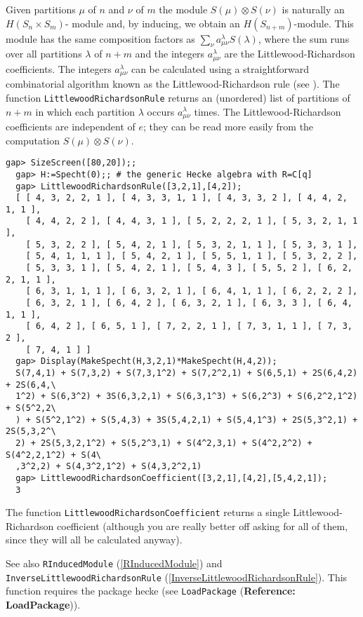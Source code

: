 \documentclass[a4paper,11pt]{report}
\begin{document}
{{{ Given partitions $\mu$ of $n$ and $\nu$ of $m$ the module $S(\mu)\otimes S(\nu)$ is naturally an $H(S_n\times S_m)$- module and, by inducing, we obtain an $H(S_{n+m})$-module. This module has the same composition factors as $\sum_{\nu} a_{\mu\nu}^\lambda S(\lambda)$, where the sum runs over all partitions $\lambda$ of $n+m$ and the integers $a_{\mu\nu}^\lambda$ are the Littlewood-Richardson coefficients. The integers $a_{\mu\nu}^\lambda$ can be calculated using a straightforward combinatorial algorithm known as the
Littlewood-Richardson rule (see \cite{JK}). The function \texttt{LittlewoodRichardsonRule} returns an (unordered) list of partitions of $n+m$ in which each partition $\lambda$ occurs $a_{\mu\nu}^\lambda$ times. The Littlewood-Richardson coefficients are independent of $e$; they can be read more easily from the computation $S(\mu)\otimes S(\nu)$. 
\begin{Verbatim}[fontsize=\small,frame=single,label=Example]
  gap> SizeScreen([80,20]);;
  gap> H:=Specht(0);; # the generic Hecke algebra with R=C[q]
  gap> LittlewoodRichardsonRule([3,2,1],[4,2]);
  [ [ 4, 3, 2, 2, 1 ], [ 4, 3, 3, 1, 1 ], [ 4, 3, 3, 2 ], [ 4, 4, 2, 1, 1 ],
    [ 4, 4, 2, 2 ], [ 4, 4, 3, 1 ], [ 5, 2, 2, 2, 1 ], [ 5, 3, 2, 1, 1 ],
    [ 5, 3, 2, 2 ], [ 5, 4, 2, 1 ], [ 5, 3, 2, 1, 1 ], [ 5, 3, 3, 1 ],
    [ 5, 4, 1, 1, 1 ], [ 5, 4, 2, 1 ], [ 5, 5, 1, 1 ], [ 5, 3, 2, 2 ],
    [ 5, 3, 3, 1 ], [ 5, 4, 2, 1 ], [ 5, 4, 3 ], [ 5, 5, 2 ], [ 6, 2, 2, 1, 1 ],
    [ 6, 3, 1, 1, 1 ], [ 6, 3, 2, 1 ], [ 6, 4, 1, 1 ], [ 6, 2, 2, 2 ],
    [ 6, 3, 2, 1 ], [ 6, 4, 2 ], [ 6, 3, 2, 1 ], [ 6, 3, 3 ], [ 6, 4, 1, 1 ],
    [ 6, 4, 2 ], [ 6, 5, 1 ], [ 7, 2, 2, 1 ], [ 7, 3, 1, 1 ], [ 7, 3, 2 ],
    [ 7, 4, 1 ] ]
  gap> Display(MakeSpecht(H,3,2,1)*MakeSpecht(H,4,2));
  S(7,4,1) + S(7,3,2) + S(7,3,1^2) + S(7,2^2,1) + S(6,5,1) + 2S(6,4,2) + 2S(6,4,\
  1^2) + S(6,3^2) + 3S(6,3,2,1) + S(6,3,1^3) + S(6,2^3) + S(6,2^2,1^2) + S(5^2,2\
  ) + S(5^2,1^2) + S(5,4,3) + 3S(5,4,2,1) + S(5,4,1^3) + 2S(5,3^2,1) + 2S(5,3,2^\
  2) + 2S(5,3,2,1^2) + S(5,2^3,1) + S(4^2,3,1) + S(4^2,2^2) + S(4^2,2,1^2) + S(4\
  ,3^2,2) + S(4,3^2,1^2) + S(4,3,2^2,1)
  gap> LittlewoodRichardsonCoefficient([3,2,1],[4,2],[5,4,2,1]);
  3
\end{Verbatim}
 The function \texttt{LittlewoodRichardsonCoefficient} returns a single Littlewood-Richardson coefficient (although you are really
better off asking for all of them, since they will all be calculated anyway).

 See also \texttt{RInducedModule} (\ref{RInducedModule}) and \texttt{InverseLittlewoodRichardsonRule} (\ref{InverseLittlewoodRichardsonRule}). This function requires the package \textsf{hecke} (see \texttt{LoadPackage} (\textbf{Reference: LoadPackage})). }

}}
\end{document}
